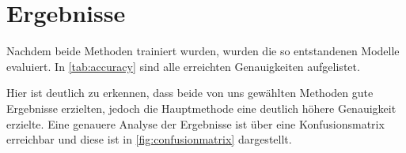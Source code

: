\section{Ergebnisse}
\label{sec:Ergebnisse}

Nachdem beide Methoden trainiert wurden, wurden die so entstandenen Modelle evaluiert.
In \autoref{tab:accuracy} sind alle erreichten Genauigkeiten aufgelistet.

\begin{table}
    \centering
    \caption{Genauigkeit der verwendeten Methoden auf den verschiedenen Teildatensätzen, wobei mit CNN das Convolutional Neural Network gemeint ist}
    \label{tab:accuracy}
\end{table}

Hier ist deutlich zu erkennen, dass beide von uns gewählten Methoden gute Ergebnisse erzielten, jedoch die Hauptmethode eine deutlich höhere Genauigkeit erzielte.
Eine genauere Analyse der Ergebnisse ist über eine Konfusionsmatrix erreichbar und diese ist in \autoref{fig:confusionmatrix} dargestellt.

